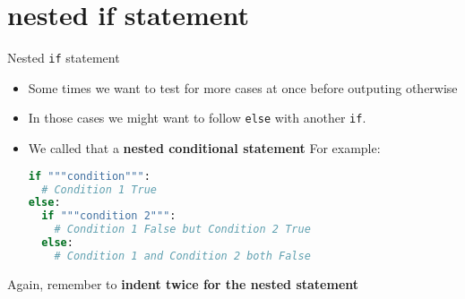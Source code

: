 \documentclass[10pt,xcolor={table,dvipsnames},t]{beamer}
\begin{document}
\section{nested if statement}
\begin{frame}[fragile]{Nested \texttt{if} statement}
  \begin{itemize}
    \item Some times we want to test for more cases at once before outputing otherwise
    \item In those cases we might want to follow \texttt{else} with another \texttt{if}. 
    \item We called that a \textbf{nested conditional statement} For example:
\begin{lstlisting}[language=python]
if """condition""":
  # Condition 1 True 
else:
  if """condition 2""":
    # Condition 1 False but Condition 2 True
  else:
    # Condition 1 and Condition 2 both False
\end{lstlisting}
  \end{itemize}
  Again, remember to \textbf{indent twice for the nested statement}
\end{frame}


\end{document}
